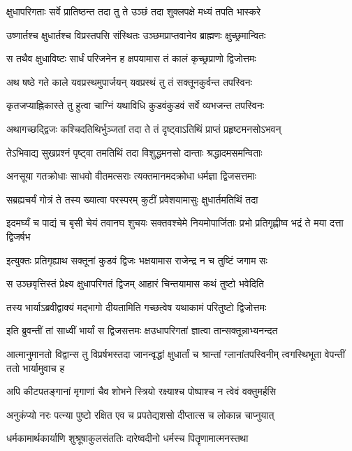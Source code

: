 \twolineshloka
{क्षुधापरिगताः सर्वे प्रातिष्ठन्त तदा तु ते}
{उञ्छं तदा शुक्लपक्षे मध्यं तपति भास्करे}


\twolineshloka
{उष्णार्तश्च क्षुधार्तश्च विप्रस्तपसि संस्थितः}
{उञ्छमप्राप्तवानेव ब्राह्मणः क्षुच्छ्रमान्वितः}


\twolineshloka
{स तथैव क्षुधाविष्टः सार्धं परिजनेन ह}
{क्षपयामास तं कालं कृच्छ्रप्राणो द्विजोत्तमः}


\twolineshloka
{अथ षष्ठे गते काले यवप्रस्थमुपार्जयन्}
{यवप्रस्थं तु तं सक्तूनकुर्वन्त तपस्विनः}


\twolineshloka
{कृतजप्याह्निकास्ते तु हुत्वा चाग्निं यथाविधि}
{कुडवंकुडवं सर्वे व्यभजन्त तपस्विनः}


\twolineshloka
{अथागच्छद्द्विजः कश्चिदतिथिर्भुञ्जतां तदा}
{ते तं दृष्ट्वाऽतिथिं प्राप्तं प्रहृष्टमनसोऽभवन्}


\twolineshloka
{तेऽभिवाद्य सुखप्रश्नं पृष्ट्वा तमतिथिं तदा}
{विशुद्धमनसो दान्ताः श्रद्धादमसमन्विताः}


\twolineshloka
{अनसूया गतक्रोधाः साधवो वीतमत्सराः}
{त्यक्तमानमदक्रोधा धर्मज्ञा द्विजसत्तमाः}


\twolineshloka
{सब्रह्यचर्यं गोत्रं ते तस्य ख्यात्वा परस्परम्}
{कुटीं प्रवेशयामासुः क्षुधार्तमतिथिं तदा}


\threelineshloka
{इदमर्घ्यं च पाद्यं च बृसी चेयं तवानघ}
{शुचयः सक्तवश्चेमे नियमोपार्जिताः प्रभो}
{प्रतिगृह्णीष्व भद्रं ते मया दत्ता द्विजर्षभ}


\twolineshloka
{इत्युक्तः प्रतिगृह्याथ सक्तूनां कुडवं द्विजः}
{भक्षयामास राजेन्द्र न च तुष्टिं जगाम सः}


\twolineshloka
{स उञ्छवृत्तिस्तं प्रेक्ष्य क्षुधापरिगतं द्विजम्}
{आहारं चिन्तयामास कथं तुष्टो भवेदिति}


\twolineshloka
{तस्य भार्याऽब्रवीद्वाक्यं मद्भागो दीयतामिति}
{गच्छत्वेष यथाकामं परितुष्टो द्विजोत्तमः}


\twolineshloka
{इति ब्रुवन्तीं तां साध्वीं भार्यां स द्विजसत्तमः}
{क्षउधापरिगतां ज्ञात्वा तान्सक्तून्नाभ्यनन्दत}


\threelineshloka
{आत्मानुमानतो विद्वान्स तु विप्रर्षभस्तदा}
{जानन्वृद्धां क्षुधार्तां च श्रान्तां ग्लानांतपस्विनीम्}
{त्वगस्थिभूता वेपन्तीं ततो भार्यामुवाच ह}


\twolineshloka
{अपि कीटपतङ्गानां मृगाणां चैव शोभने}
{स्त्रियो रक्ष्याश्च पोष्पाश्च न त्वेवं वक्तुमर्हसि}


\twolineshloka
{अनुकंप्यो नरः पत्न्या पुष्टो रक्षित एव च}
{प्रपतेद्यशसो दीप्तात्स च लोकान्न चाप्नुयात्}


\twolineshloka
{धर्मकामार्थकार्याणि शुश्रूषाकुलसंततिः}
{दारेष्वदीनो धर्मस्च पितॄणामात्मनस्तथा}


